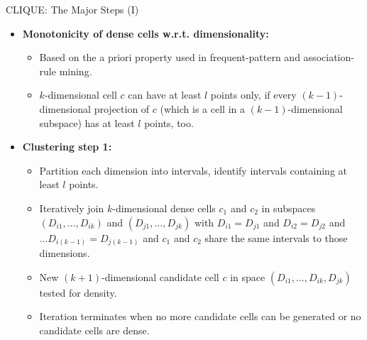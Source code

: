 \begin{frame}{CLIQUE: The Major Steps (I)}
	\begin{itemize}
		\item \textbf{Monotonicity of dense cells w.r.t. dimensionality:}
		      \begin{itemize}
			      \item Based on the a priori property used in frequent-pattern and
			            association-rule mining.
			      \item $k$-dimensional cell $c$ can have at least $l$ points only,
			            if every $(k-1)$-dimensional projection of $c$ (which is a cell in
			            a $(k-1)$-dimensional subspace) has at least $l$ points, too.
		      \end{itemize}
		\item \textbf{Clustering step 1:}
		      \begin{itemize}
			      \item Partition each dimension into intervals, identify intervals
			            containing at least $l$ points.
			      \item Iteratively join $k$-dimensional dense cells $c_1$ and $c_2$
			            in subspaces $(D_{i1}, \ldots, D_{ik})$ and $(D_{j1}, \ldots,D_{jk})$ with $D_{i1} = D_{j1}$ and $D_{i2} = D_{j2}$ and $\ldots D_{i(k-1)} = D_{j(k-1)}$ and $c_1$ and $c_2$ share the same
			            intervals to those dimensions.
			      \item New $(k+1)$-dimensional candidate cell $c$ in space $(D_{i1}, \ldots, D_{ik}, D_{jk})$ tested for density.
			      \item Iteration terminates when no more candidate cells can be generated or no candidate cells are dense.
		      \end{itemize}
	\end{itemize}
\end{frame}

